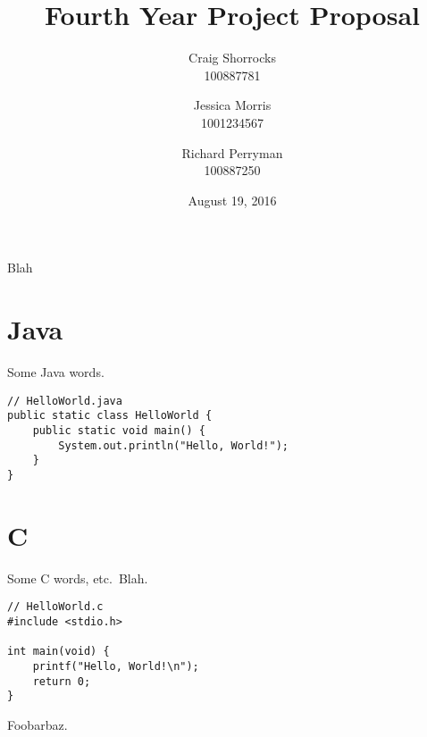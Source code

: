 \documentclass{article}
\title{Fourth Year Project Proposal}
\author{
	Craig Shorrocks \\
	100887781
	\and
	Jessica Morris \\
	1001234567
	\and
	Richard Perryman \\
	100887250
}
\date{August 19, 2016}
\begin{document}
\maketitle

\pagebreak

Blah

\section{Java}

Some Java words.

\lstset{language=Java}

\begin{lstlisting}
// HelloWorld.java
public static class HelloWorld {
	public static void main() {
		System.out.println("Hello, World!");
	}
}
\end{lstlisting}

\section{C}

Some C words, etc.\ Blah.

\lstset{
	language=C,
	showstringspaces=false
}

\begin{lstlisting}
// HelloWorld.c
#include <stdio.h>

int main(void) {
	printf("Hello, World!\n");
	return 0;
}
\end{lstlisting}

Foobarbaz.
\end{document}
